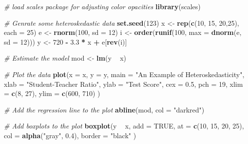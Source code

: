 \documentclass[]{book}
\newenvironment{Shaded}{\begin{snugshade}}{\end{snugshade}}
\newcommand{\KeywordTok}[1]{\textcolor[rgb]{0.13,0.29,0.53}{\textbf{#1}}}
\newcommand{\DataTypeTok}[1]{\textcolor[rgb]{0.13,0.29,0.53}{#1}}
\newcommand{\DecValTok}[1]{\textcolor[rgb]{0.00,0.00,0.81}{#1}}
\newcommand{\FloatTok}[1]{\textcolor[rgb]{0.00,0.00,0.81}{#1}}
\newcommand{\StringTok}[1]{\textcolor[rgb]{0.31,0.60,0.02}{#1}}
\newcommand{\CommentTok}[1]{\textcolor[rgb]{0.56,0.35,0.01}{\textit{#1}}}
\newcommand{\OtherTok}[1]{\textcolor[rgb]{0.56,0.35,0.01}{#1}}
\newcommand{\OperatorTok}[1]{\textcolor[rgb]{0.81,0.36,0.00}{\textbf{#1}}}
\newcommand{\NormalTok}[1]{#1}
\theoremstyle{definition}
\theoremstyle{definition}
\theoremstyle{definition}
\theoremstyle{remark}
\begin{document}
\begin{Shaded}
\begin{Highlighting}[]
\CommentTok{# load scales package for adjusting color opacities}
\KeywordTok{library}\NormalTok{(scales)}

\CommentTok{# Genrate some heteroskedastic data}
\KeywordTok{set.seed}\NormalTok{(}\DecValTok{123}\NormalTok{) }
\NormalTok{x <-}\StringTok{ }\KeywordTok{rep}\NormalTok{(}\KeywordTok{c}\NormalTok{(}\DecValTok{10}\NormalTok{, }\DecValTok{15}\NormalTok{, }\DecValTok{20}\NormalTok{,}\DecValTok{25}\NormalTok{), }\DataTypeTok{each =} \DecValTok{25}\NormalTok{)}
\NormalTok{e <-}\StringTok{ }\KeywordTok{rnorm}\NormalTok{(}\DecValTok{100}\NormalTok{, }\DataTypeTok{sd =} \DecValTok{12}\NormalTok{)                }
\NormalTok{i <-}\StringTok{ }\KeywordTok{order}\NormalTok{(}\KeywordTok{runif}\NormalTok{(}\DecValTok{100}\NormalTok{, }\DataTypeTok{max =} \KeywordTok{dnorm}\NormalTok{(e, }\DataTypeTok{sd =} \DecValTok{12}\NormalTok{))) }
\NormalTok{y <-}\StringTok{ }\DecValTok{720} \OperatorTok{-}\StringTok{ }\FloatTok{3.3} \OperatorTok{*}\StringTok{ }\NormalTok{x }\OperatorTok{+}\StringTok{ }\NormalTok{e[}\KeywordTok{rev}\NormalTok{(i)]}

\CommentTok{# Estimate the model }
\NormalTok{mod <-}\StringTok{ }\KeywordTok{lm}\NormalTok{(y }\OperatorTok{~}\StringTok{ }\NormalTok{x)}

\CommentTok{# Plot the data}
\KeywordTok{plot}\NormalTok{(}\DataTypeTok{x =}\NormalTok{ x, }
     \DataTypeTok{y =}\NormalTok{ y, }
     \DataTypeTok{main =} \StringTok{"An Example of Heteroskedasticity"}\NormalTok{,}
     \DataTypeTok{xlab =} \StringTok{"Student-Teacher Ratio"}\NormalTok{,}
     \DataTypeTok{ylab =} \StringTok{"Test Score"}\NormalTok{,}
     \DataTypeTok{cex =} \FloatTok{0.5}\NormalTok{, }
     \DataTypeTok{pch =} \DecValTok{19}\NormalTok{, }
     \DataTypeTok{xlim =} \KeywordTok{c}\NormalTok{(}\DecValTok{8}\NormalTok{, }\DecValTok{27}\NormalTok{), }
     \DataTypeTok{ylim =} \KeywordTok{c}\NormalTok{(}\DecValTok{600}\NormalTok{, }\DecValTok{710}\NormalTok{)}
\NormalTok{     )}

\CommentTok{# Add the regression line to the plot}
\KeywordTok{abline}\NormalTok{(mod, }\DataTypeTok{col =} \StringTok{"darkred"}\NormalTok{)}

\CommentTok{# Add boxplots to the plot}
\KeywordTok{boxplot}\NormalTok{(y }\OperatorTok{~}\StringTok{ }\NormalTok{x, }
        \DataTypeTok{add =} \OtherTok{TRUE}\NormalTok{, }
        \DataTypeTok{at =} \KeywordTok{c}\NormalTok{(}\DecValTok{10}\NormalTok{, }\DecValTok{15}\NormalTok{, }\DecValTok{20}\NormalTok{, }\DecValTok{25}\NormalTok{), }
        \DataTypeTok{col =} \KeywordTok{alpha}\NormalTok{(}\StringTok{"gray"}\NormalTok{, }\FloatTok{0.4}\NormalTok{), }
        \DataTypeTok{border =} \StringTok{"black"}
\NormalTok{        )}
\end{Highlighting}
\end{Shaded}
\end{document}
